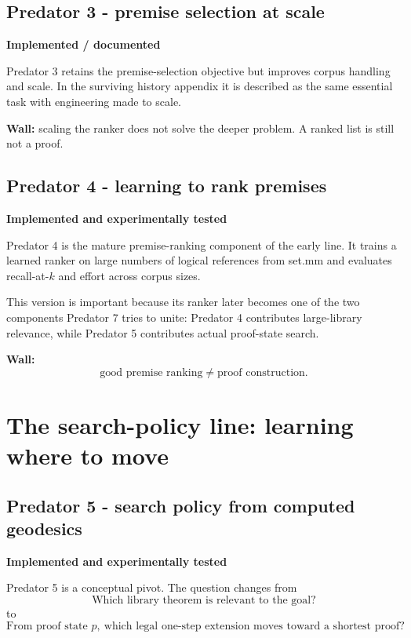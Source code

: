 \documentclass[11pt]{article}
\newcommand{\implemented}{\textbf{Implemented / documented}}
\newcommand{\tested}{\textbf{Implemented and experimentally tested}}
\begin{document}
\subsection{Predator 3 - premise selection at scale}

\begin{statusbox}\implemented\end{statusbox}

Predator 3 retains the premise-selection objective but improves corpus handling and scale. In the surviving history appendix it is described as the same essential task with engineering made to scale.

\textbf{Wall:} scaling the ranker does not solve the deeper problem. A ranked list is still not a proof.

\subsection{Predator 4 - learning to rank premises}

\begin{statusbox}\tested\end{statusbox}

Predator 4 is the mature premise-ranking component of the early line. It trains a learned ranker on large numbers of logical references from set.mm and evaluates recall-at-$k$ and effort across corpus sizes.

This version is important because its ranker later becomes one of the two components Predator 7 tries to unite: Predator 4 contributes large-library relevance, while Predator 5 contributes actual proof-state search.

\textbf{Wall:}
\[
\boxed{\text{good premise ranking} \neq \text{proof construction}.}
\]

\section{The search-policy line: learning where to move}

\subsection{Predator 5 - search policy from computed geodesics}

\begin{statusbox}\tested\end{statusbox}

Predator 5 is a conceptual pivot. The question changes from
\[
\text{Which library theorem is relevant to the goal?}
\]
to
\[
\text{From proof state }p,\ \text{which legal one-step extension moves toward a shortest proof?}
\]
\end{document}
